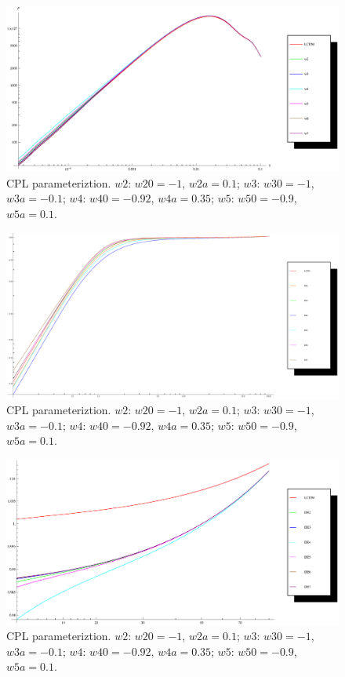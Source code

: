 \documentclass{article}
\begin{document}
{\begin{figure}[!htbp]
\centering
\includegraphics[width=400pt]{CPL_Sync_2012-02-20_PowerSpectrum.eps}
\caption{CPL parameteriztion. $w2$: $w20=-1$, $w2a=0.1$; $w3$: $w30=-1$, $w3a=-0.1$; $w4$: $w40=-0.92$, $w4a=0.35$; $w5$: $w50=-0.9$, $w5a=0.1$.}\label{fig:PowerSpectrum_CPL_SynchronousGauge_2012-02-19}
\end{figure}


\begin{figure}[!htbp]
\centering
\includegraphics[width=400pt]{CPL_Sync_2012-02-20_Growth.eps}
\caption{CPL parameteriztion. $w2$: $w20=-1$, $w2a=0.1$; $w3$: $w30=-1$, $w3a=-0.1$; $w4$: $w40=-0.92$, $w4a=0.35$; $w5$: $w50=-0.9$, $w5a=0.1$.}\label{fig:Growth_CPL_SynchronousGauge_2012-02-19}
\end{figure}


\begin{figure}[!htbp]
\centering
\includegraphics[width=400pt]{CPL_Sync_2012-02-20_Growth2.eps}
\caption{CPL parameteriztion. $w2$: $w20=-1$, $w2a=0.1$; $w3$: $w30=-1$, $w3a=-0.1$; $w4$: $w40=-0.92$, $w4a=0.35$; $w5$: $w50=-0.9$, $w5a=0.1$.}\label{fig:Growth2_CPL_SynchronousGauge_2012-02-19}
\end{figure}

}
\end{document}
